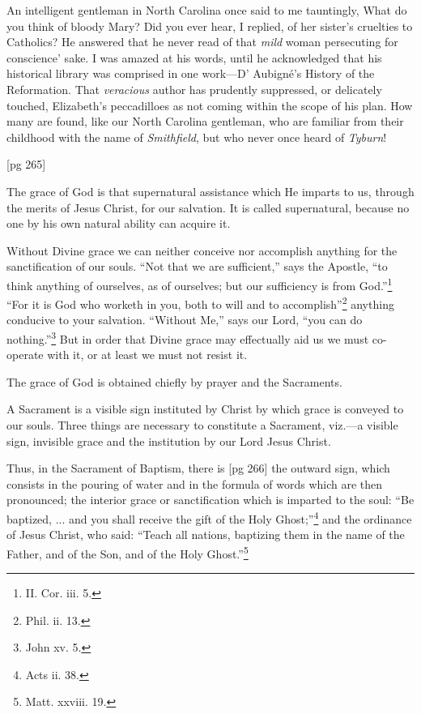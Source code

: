 An intelligent gentleman in North Carolina once
said to me tauntingly, What do you think of
bloody Mary? Did you ever hear, I replied, of
her sister's cruelties to Catholics? He answered
that he never read of that \emph{mild} woman persecuting
for conscience' sake. I was amazed at his
words, until he acknowledged that his historical
library was comprised in one work—D' Aubigné's
History of the Reformation. That \emph{veracious} author
has prudently suppressed, or delicately
touched, Elizabeth's peccadilloes as not coming
within the scope of his plan. How many are
found, like our North Carolina gentleman, who
are familiar from their childhood with the name
of \emph{Smithfield}, but who never once heard of
\emph{Tyburn}!

[pg 265]


The grace of God is that supernatural assistance
which He imparts to us, through the
merits of Jesus Christ, for our salvation. It
is called supernatural, because no one by his own
natural ability can acquire it.

Without Divine grace we can neither conceive
nor accomplish anything for the sanctification of
our souls. “Not that we are sufficient,” says
the Apostle, “to think anything of ourselves, as
of ourselves; but our sufficiency is from God.”\footnote{II.
Cor. iii. 5.} “For it is God who worketh in you, both to will
and to accomplish”\footnote{Phil. ii.
13.} anything conducive to your
salvation. “Without Me,” says our Lord, “you
can do nothing.”\footnote{John xv.
5.} But in order that Divine grace
may effectually aid us we must co-operate with
it, or at least we must not resist it.

The grace of God is obtained chiefly by prayer
and the Sacraments.

A Sacrament is a visible sign instituted by
Christ by which grace is conveyed to our souls.
Three things are necessary to constitute a Sacrament,
viz.—a visible sign, invisible grace and the
institution by our Lord Jesus Christ.

Thus, in the Sacrament of Baptism, there is
[pg 266]
the outward sign, which consists in the pouring
of water and in the formula of words which are
then pronounced; the interior grace or sanctification
which is imparted to the soul: “Be baptized, ...
and you shall receive the gift of the
Holy Ghost;”\footnote{Acts ii.
38.} and the ordinance of Jesus Christ,
who said: “Teach all nations, baptizing them in
the name of the Father, and of the Son, and of
the Holy Ghost.”\footnote{Matt. xxviii. 19.}

